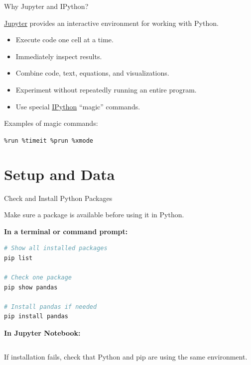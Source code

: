 \documentclass[aspectratio=43]{beamer}
\begin{document}
\begin{frame}{Why Jupyter and IPython?}

\href{https://jupyter.org}{Jupyter} provides an interactive environment for working with Python.

\begin{itemize}
  \item Execute code one cell at a time.
  \item Immediately inspect results.
  \item Combine code, text, equations, and visualizations.
  \item Experiment without repeatedly running an entire program.
  \item Use special \href{https://ipython.org}{IPython} ``magic'' commands.
\end{itemize}

\vspace{0.3cm}

Examples of magic commands:

\begin{center}
  \texttt{\%run \qquad \%timeit \qquad \%prun \qquad \%xmode}
\end{center}

\end{frame}

\section{Setup and Data}

\begin{frame}[fragile]{Check and Install Python Packages}

Make sure a package is available before using it in Python.

\vspace{0.4em}

\textbf{In a terminal or command prompt:}

\begin{lstlisting}[language=bash]
# Show all installed packages
pip list

# Check one package
pip show pandas

# Install pandas if needed
pip install pandas
\end{lstlisting}

\vspace{0.3em}

\textbf{In Jupyter Notebook:}

\begin{lstlisting}[language=Python]
%pip install pandas
\end{lstlisting}

\vspace{0.3em}

If installation fails, check that Python and pip are using the same environment.

\end{frame}
\end{document}
